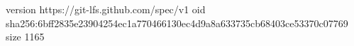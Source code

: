 version https://git-lfs.github.com/spec/v1
oid sha256:6bff2835e23904254ec1a770466130ec4d9a8a633735cb68403ce53370c07769
size 1165
